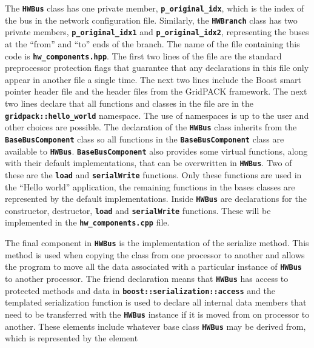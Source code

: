 \documentclass[12pt]{report} %
\begin{document}
The \texttt{\textbf{HWBus}} class has one private member, \texttt{\textbf{p\_original\_idx}}, which is the index of the bus in the network configuration file. Similarly, the \texttt{\textbf{HWBranch}} class has two private members, \texttt{\textbf{p\_original\_idx1}} and \texttt{\textbf{p\_original\_idx2}}, representing the buses at the ``from'' and ``to'' ends of the branch. The name of the file containing this code is \texttt{\textbf{hw\_components.hpp}}. The first two lines of the file are the standard preprocessor protection flags that guarantee that any declarations in this file only appear in another file a single time. The next two lines include the Boost smart pointer header file and the header files from the GridPACK framework. The next two lines declare that all functions and classes in the file are in the \texttt{\textbf{gridpack::hello\_world}} namespace. The use of namespaces is up to the user and other choices are possible. The declaration of the \texttt{\textbf{HWBus}} class inherits from the \texttt{\textbf{BaseBusComponent}} class so all functions in the \texttt{\textbf{BaseBusComponent}} class are available to \texttt{\textbf{HWBus}}. \texttt{\textbf{BaseBusComponent}} also provides some virtual functions, along with their default implementations, that can be overwritten in \texttt{\textbf{HWBus}}. Two of these are the \texttt{\textbf{load}} and \texttt{\textbf{serialWrite}} functions. Only these functions are used in the ``Hello world'' application, the remaining functions in the bases classes are represented by the default implementations. Inside \texttt{\textbf{HWBus}} are declarations for the constructor, destructor, \texttt{\textbf{load}} and \texttt{\textbf{serialWrite}} functions. These will be implemented in the \texttt{\textbf{hw\_components.cpp}} file.

The final component in \texttt{\textbf{HWBus}} is the implementation of the serialize method. This method is used when copying the class from one processor to another and allows the program to move all the data associated with a particular instance of \texttt{\textbf{HWBus}} to another processor. The friend declaration means that \texttt{\textbf{HWBus}} has access to protected methods and data in \texttt{\textbf{boost::serialization::access}} and the templated serialization function is used to declare all internal data members that need to be transferred with the \texttt{\textbf{HWBus}} instance if it is moved from on processor to another. These elements include whatever base class \texttt{\textbf{HWBus}} may be derived from, which is represented by the element
\end{document}
